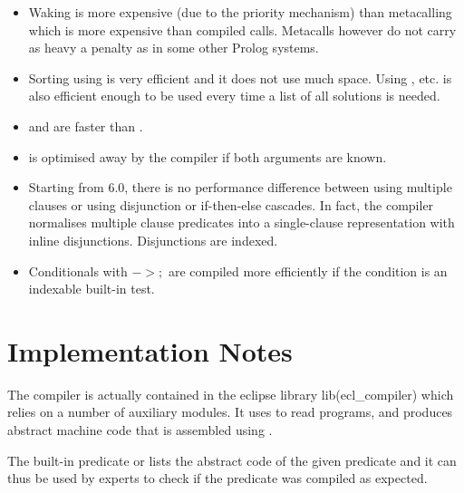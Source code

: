 \begin{itemize}
\item Waking is more expensive (due to the priority mechanism) than metacalling
which is more expensive than compiled calls.
Metacalls however do not carry as heavy a penalty as in 
some other Prolog systems.

\item Sorting using  is very efficient and it does not use
much space.
Using ,  etc. is also efficient enough
to be used every time a list of all solutions is needed.


\item {} and
are faster than .

\item {} is optimised away by the compiler
if both arguments are known.

\item Starting from {\eclipse} 6.0, there is no performance difference between
using multiple clauses or using disjunction or if-then-else cascades.
In fact, the compiler normalises multiple clause predicates into
a single-clause representation with inline disjunctions.
Disjunctions are indexed.

\item Conditionals with {\bf $-> ;$} are compiled more efficiently
if the condition is an indexable built-in test.

\end{itemize}


\section{Implementation Notes}

The {\eclipse} compiler is actually contained in the eclipse library
lib(ecl_compiler) which relies on a number of auxiliary modules.
It uses
to read programs, and produces abstract
machine code that is assembled using
.

The built-in predicate 
or 
lists the abstract code of the given predicate and it can thus be used by experts
to check if the predicate was compiled as expected.








